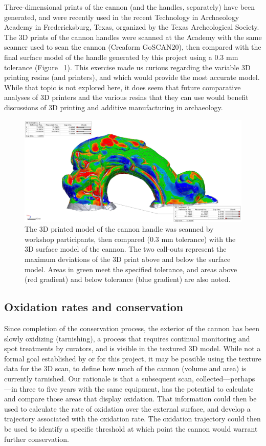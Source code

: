 \documentclass[review]{elsarticle}
\begin{document}
Three-dimensional prints of the cannon (and the handles, separately) have been generated, and were recently used in the recent Technology in Archaeology Academy in Fredericksburg, Texas, organized by the Texas Archeological Society. The 3D prints of the cannon handles were scanned at the Academy with the same scanner used to scan the cannon (Creaform GoSCAN20), then compared with the final surface model of the handle generated by this project using a 0.3 mm tolerance (Figure ~\ref{fig:Fig6}). This exercise made us curious regarding the variable 3D printing resins (and printers), and which would provide the most accurate model. While that topic is not explored here, it does seem that future comparative analyses of 3D printers and the various resins that they can use would benefit discussions of 3D printing and additive manufacturing in archaeology.

\begin{figure}[ht]\centering
\includegraphics[width=\linewidth]{CannonCompare}
\caption{The 3D printed model of the cannon handle was scanned by workshop participants, then compared (0.3 mm tolerance) with the 3D surface model of the cannon. The two call-outs represent the maximum deviations of the 3D print above and below the surface model. Areas in green meet the specified tolerance, and areas above (red gradient) and below tolerance (blue gradient) are also noted.}
\label{fig:Fig6}
\end{figure}

\subsection*{Oxidation rates and conservation}

Since completion of the conservation process, the exterior of the cannon has been slowly oxidizing (tarnishing), a process that requires continual monitoring and spot treatments by curators, and is visible in the textured 3D model. While not a formal goal established by or for this project, it may be possible using the texture data for the 3D scan, to define how much of the cannon (volume and area) is currently tarnished. Our rationale is that a subsequent scan, collected---perhaps---in three to five years with the same equipment, has the potential to calculate and compare those areas that display oxidation. That information could then be used to calculate the rate of oxidation over the external surface, and develop a trajectory associated with the oxidation rate. The oxidation trajectory could then be used to identify a specific threshold at which point the cannon would warrant further conservation. 
\end{document}
